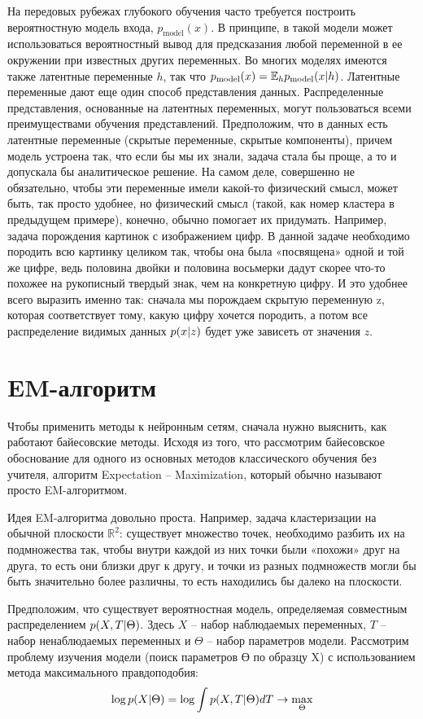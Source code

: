 На передовых рубежах глубокого обучения часто требуется построить вероятностную модель входа, $p_{\text{model}} (x)$. В принципе, в такой модели может использоваться вероятностный вывод для предсказания любой переменной в ее окружении при известных других переменных. Во многих моделях имеются также латентные переменные $h$, так что $p_{\text{model}}(x) = \mathbb{E}_{h} p_{\text{model}}(x \arrowvert h)$. Латентные переменные дают еще один способ представления данных. Распределенные представления, основанные на латентных переменных, могут пользоваться всеми преимуществами обучения представлений.
Предположим, что в данных есть латентные переменные (скрытые переменные, скрытые компоненты), причем модель устроена так, что если бы мы их знали, задача стала бы проще, а то и допускала бы аналитическое решение. На самом деле, совершенно не обязательно, чтобы эти переменные имели какой-то физический смысл, может быть, так просто удобнее, но физический смысл (такой, как номер кластера в предыдущем примере), конечно, обычно помогает их придумать. Например, задача порождения картинок с изображением цифр. В данной задаче необходимо породить всю картинку целиком так, чтобы она была «посвящена» одной и той же цифре, ведь половина двойки и половина восьмерки дадут скорее что-то похожее на рукописный твердый знак, чем на конкретную цифру. И это удобнее всего выразить именно так: сначала мы порождаем скрытую переменную z, которая соответствует тому, какую цифру хочется породить, а потом все распределение видимых данных $p(x \arrowvert z)$ будет уже зависеть от значения $z$.

\section{EM-алгоритм}
Чтобы применить  методы к нейронным сетям, сначала нужно выяснить, как работают байесовские методы. Исходя из того, что рассмотрим байесовское обоснование для одного из основных методов классического обучения без учителя, алгоритм  Expectation -- Maximization, который обычно называют просто EM-алгоритмом.

Идея EM-алгоритма довольно проста. Например, задача кластеризации на обычной плоскости $\mathbb{R}^2$: существует множество точек, необходимо разбить их на подмножества так, чтобы внутри каждой из них точки были «похожи» друг на друга, то есть они близки друг к другу, и точки из разных подмножеств могли бы быть значительно более различны, то есть находились бы далеко на плоскости.

Предположим, что существует вероятностная модель, определяемая совместным распределением $p(X, T \arrowvert \Theta)$. Здесь $X$ -- набор наблюдаемых переменных, $T$ -- набор ненаблюдаемых переменных и $\Theta$ -- набор параметров модели. Рассмотрим проблему изучения модели (поиск параметров Ө по образцу X) с использованием метода максимального правдоподобия:
\begin{equation}  \label{eq:one}
 \log{p(X \arrowvert \Theta)} = \log{\int{p(X,T \arrowvert \Theta) dT} \rightarrow \max\limits_{\Theta}^{} }
\end{equation}

